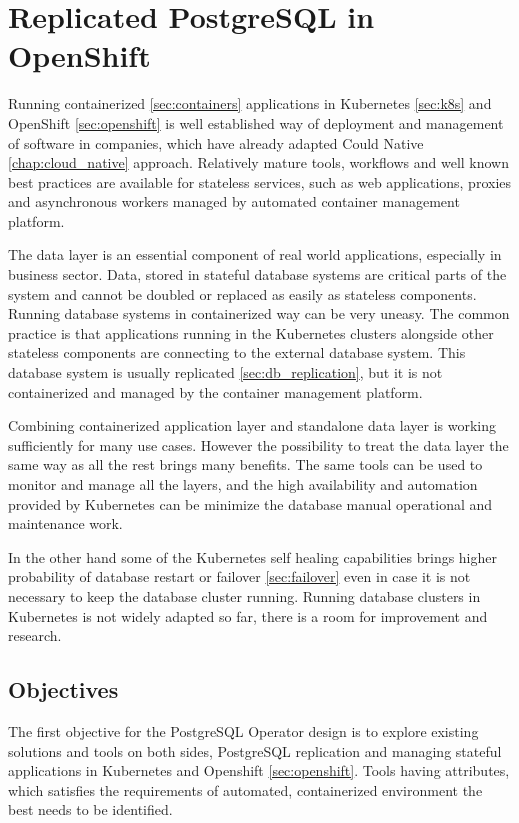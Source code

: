 \documentclass[
  digital, %
  twoside, %
  table,   %
  lof,     %
  lot,     %
]{fithesis3}
\begin{document}
\chapter{Replicated PostgreSQL in OpenShift} \label{chap:pg_in_openshift}
Running containerized \ref{sec:containers} applications in Kubernetes \ref{sec:k8s} and OpenShift \ref{sec:openshift} is well established way of deployment and management of software in companies, which have already adapted Could Native \ref{chap:cloud_native} approach. Relatively mature tools, workflows and well known best practices are available for stateless services, such as web applications, proxies and asynchronous workers managed by automated container management platform.

The data layer is an essential component of real world applications, especially in business sector. Data, stored in stateful database systems are critical parts of the system and cannot be doubled or replaced as easily as stateless components. Running database systems in containerized way can be very uneasy. The common practice is that applications running in the Kubernetes clusters alongside other stateless components are connecting to the external database system. This database system is usually replicated \ref{sec:db_replication}, but it is not containerized and managed by the container management platform.

Combining containerized application layer and standalone data layer is working sufficiently for many use cases. However the possibility to treat the data layer the same way as all the rest brings many benefits. The same tools can be used to monitor and manage all the layers, and the high availability and automation provided by Kubernetes can be minimize the database manual operational and maintenance work.

In the other hand some of the Kubernetes self healing capabilities brings higher probability of database restart or failover \ref{sec:failover} even in case it is not necessary to keep the database cluster running. Running database clusters in Kubernetes is not widely adapted so far, there is a room for improvement and research.

\section{Objectives}
The first objective for the PostgreSQL Operator design is to explore existing solutions and tools on both sides, PostgreSQL replication and managing stateful applications in Kubernetes and Openshift \ref{sec:openshift}. Tools having attributes, which satisfies the requirements of automated, containerized environment the best needs to be identified.
\end{document}

